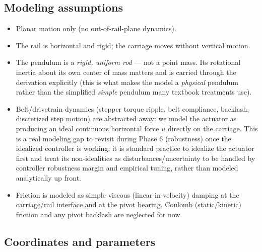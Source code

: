 \documentclass[11pt]{article}
\begin{document}
\subsection{Modeling assumptions}
\begin{itemize}[leftmargin=*]
  \item Planar motion only (no out-of-rail-plane dynamics).
  \item The rail is horizontal and rigid; the carriage moves without
    vertical motion.
  \item The pendulum is a \emph{rigid, uniform rod} — not a point mass. Its
    rotational inertia about its own center of mass matters and is carried
    through the derivation explicitly (this is what makes the model a
    \emph{physical} pendulum rather than the simplified \emph{simple}
    pendulum many textbook treatments use).
  \item Belt/drivetrain dynamics (stepper torque ripple, belt compliance,
    backlash, discretized step motion) are abstracted away: we model the
    actuator as producing an ideal continuous horizontal force $u$ directly
    on the carriage. This is a real modeling gap to revisit during Phase 6
    (robustness) once the idealized controller is working; it is standard
    practice to idealize the actuator first and treat its non-idealities as
    disturbances/uncertainty to be handled by controller robustness margin
    and empirical tuning, rather than modeled analytically up front.
  \item Friction is modeled as simple viscous (linear-in-velocity) damping
    at the carriage/rail interface and at the pivot bearing. Coulomb
    (static/kinetic) friction and any pivot backlash are neglected for now.
\end{itemize}

\subsection{Coordinates and parameters}
\end{document}
